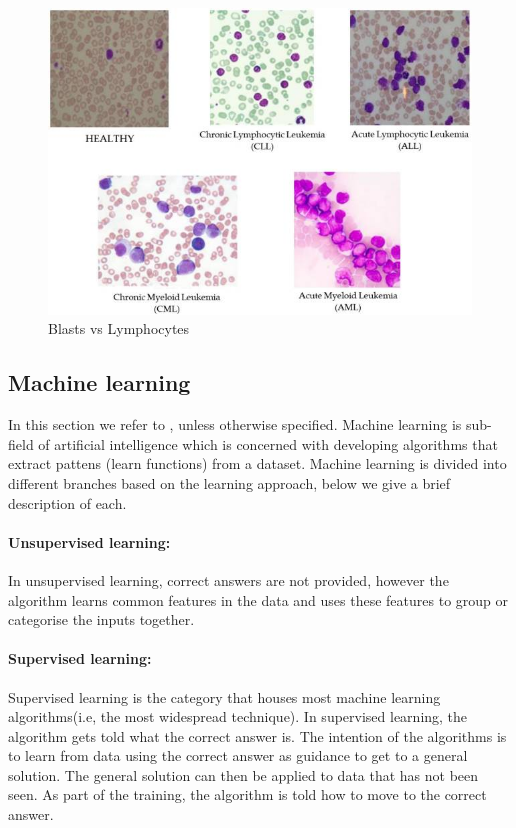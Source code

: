 \documentclass[a4paper,11pt]{article}
\begin{document}
 \begin{figure}[!htbp]
 \centering
\includegraphics[scale=0.5]{ImDB2.jpeg} 
  \caption{Blasts vs Lymphocytes \citep{Ahmed}}
  \label{fig: compare}
 \end{figure} 
 
\subsection{Machine learning}
\label{machineLearning}
In this section we refer to \cite{Stephen}, unless otherwise specified. Machine learning is sub-field of artificial intelligence which is concerned with developing algorithms that extract pattens (learn functions) from a dataset. Machine learning is divided into different branches based on the learning approach, below we give a brief description of each.

\paragraph{Unsupervised learning:}
In unsupervised learning, correct answers are not provided, however the algorithm learns common features in the data and uses these features to group or categorise the inputs together.

\paragraph{Supervised learning:}
Supervised learning is the category that houses most machine learning algorithms(i.e, the most widespread technique). In supervised learning, the algorithm gets told what the correct answer is. The intention of the algorithms is  to learn from data using the correct answer as guidance to get to a general solution. The general solution can then be applied to data  that has not been seen. As part of the training, the algorithm is told how to move to the correct answer. 
\end{document}
